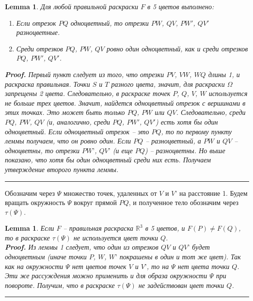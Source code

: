 \documentclass{report}%
\newtheorem{lemma}[theorem]{Lemma}
\newenvironment{proof}[1][Proof]{\textbf{#1.} }{\ \rule{0.5em}{0.5em}}
\begin{document}
\begin{lemma}
		Для любой правильной раскраски $F$ в 5 цветов выполнено:
		\begin{enumerate}
				\item Если отрезок $PQ$ одноцветный, то отрезки $PW$, $QV$, $PW'$, $QV'$ разноцветные. 
				\item Среди отрезков $PQ$, $PW$, $QV$ ровно один одноцветный, как и среди отрезков $PQ$, $PW'$, $QV'$.
		\end{enumerate}
		\begin{proof}
				Первый пункт следует из того, что отрезки $PV$, $VW$, $WQ$ длины 1, и раскраска правильная.
				Точки $S$ и $T$ разного цвета, значит, для раскраски $\Omega$ запрещены 2 цвета.
				Следовательно, в раскраске точек $P$, $Q$, $V$, $W$ используется не больше трех цветов.
				Значит, найдется одноцветный отрезок с вершинами в этих точках. Это может быть только $PQ$, $PW$ или $QV$.
				Следовательно, среди $PQ$, $PW$, $QV$ (и, аналогично, среди $PQ$, $PW'$, $QV'$) есть хотя бы один одноцветный.
				Если одноцветный отрезок – это $PQ$, то по первому пункту леммы получаем, что он ровно один.
				Если $PQ$ – разноцветный, а $PW$ и $QV$ – одноцветны, то отрезки $PW’$, $QV’$ (и еще $PQ$) – разноцветны.
				Но выше показано, что хотя бы один одноцветный среди них есть. Получаем утверждение второго пункта леммы.
		\end{proof}
\end{lemma}

Обозначим через $\Psi$ множество точек, удаленных от $V$ и $V’$ на расстояние 1. Будем вращать окружность $\Psi$ вокруг прямой $PQ$, и полученное тело обозначим через $\tau(\Psi)$.

\begin{lemma}
		Если $F$ – правильная раскраска  $\mathbb{R}^3$ в 5 цветов, и $F(P) \ne F(Q)$,
		то в раскраске $\tau(\Psi)$ не используется цвет точки $Q$. \\
		\begin{proof}
				Из леммы 1 следует, что один из отрезков $QV$ и $QV’$ будет одноцветным
				(иначе точки $P$, $W$, $W’$ покрашены в один и тот же цвет).
				Так как на окружности $\Psi$ нет цветов точек $V$ и $V’$, то на  $\Psi$ нет цвета точки $Q$.
				Эти же рассуждения можно применить и для образа окружности $\Psi$ при повороте.
				Получим, что в раскраске $\tau(\Psi)$ не задействован цвет точки $Q$.
		\end{proof}
\end{lemma}
\end{document}
